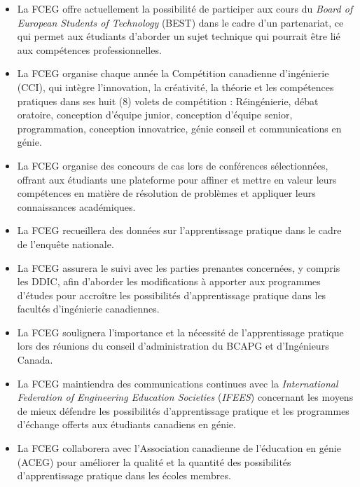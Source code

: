 \begin{itemize}
 \item La FCEG offre actuellement la possibilité de participer aux cours du \textit{Board of European Students of Technology} (BEST) dans le cadre d'un partenariat, ce qui permet aux étudiants d'aborder un sujet technique qui pourrait être lié aux compétences professionnelles.
 \item La FCEG organise chaque année la Compétition canadienne d'ingénierie (CCI), qui intègre l'innovation, la créativité, la théorie et les compétences pratiques dans ses huit (8) volets de compétition : Réingénierie, débat oratoire, conception d'équipe junior, conception d'équipe senior, programmation, conception innovatrice, génie conseil et communications en génie.
 \item La FCEG organise des concours de cas lors de conférences sélectionnées, offrant aux étudiants une plateforme pour affiner et mettre en valeur leurs compétences en matière de résolution de problèmes et appliquer leurs connaissances académiques.
\end{itemize}

\begin{itemize}
 \item La FCEG recueillera des données sur l'apprentissage pratique dans le cadre de l'enquête nationale.
 \item La FCEG assurera le suivi avec les parties prenantes concernées, y compris les DDIC, afin d'aborder les modifications à apporter aux programmes d'études pour accroître les possibilités d'apprentissage pratique dans les facultés d'ingénierie canadiennes.
 \item La FCEG soulignera l'importance et la nécessité de l'apprentissage pratique lors des réunions du conseil d'administration du BCAPG et d'Ingénieurs Canada.
 \item La FCEG maintiendra des communications continues avec la \textit{International Federation of Engineering Education Societies} (\textit{IFEES}) concernant les moyens de mieux défendre les possibilités d'apprentissage pratique et les programmes d'échange offerts aux étudiants canadiens en génie.
 \item La FCEG collaborera avec l'Association canadienne de l'éducation en génie (ACEG) pour améliorer la qualité et la quantité des possibilités d'apprentissage pratique dans les écoles membres.
\end{itemize}

\newpage
